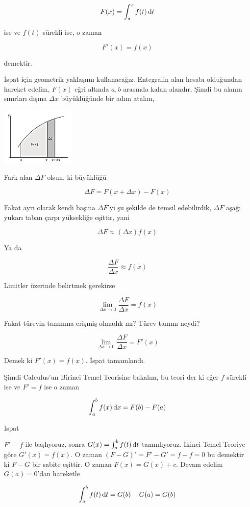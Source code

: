 \documentclass[12pt,fleqn]{article}\usepackage{../../common}
\begin{document}
$$
F(x) = \int _{a}^{x} f(t)\,\mathrm{d} t 
$$

ise ve $f(t)$ sürekli ise, o zaman

$$
F'(x) = f(x)
$$

demektir.

İspat için geometrik yaklaşımı kullanacağız. Entegralin alan hesabı olduğundan
hareket edelim, $F(x)$ eğri altında $a,b$ arasında kalan alandır. Şimdi bu
alanın sınırları dışına $\Delta x$ büyüklüğünde bir adım atalım, 

\includegraphics[width=10em]{ode_mattuck_65_diffint1_05.jpg}

Fark alan $\Delta F$ olsun, ki büyüklüğü

$$
\Delta F = F(x + \Delta x) - F(x)
$$

Fakat ayrı olarak kendi başına $\Delta F$'yi şu şekilde de temsil edebilirdik,
$\Delta F$ aşağı yukarı taban çarpı yüksekliğe eşittir, yani

$$
\Delta F \approx (\Delta x) f(x)
$$

Ya da

$$
\frac{\Delta F}{\Delta x} \approx f(x)
$$

Limitler üzerinde belirtmek gerekirse

$$
\lim_{\Delta x \to 0} \frac{\Delta F}{\Delta x} = f(x)
$$

Fakat türevin tanımına erişmiş olmadık mı? Türev tanımı neydi?

$$
\lim_{\Delta x \to 0} \frac{\Delta F}{\Delta x} = F'(x)
$$

Demek ki $F'(x) = f(x)$. İspat tamamlandı.

Şimdi Calculus'un Birinci Temel Teorisine bakalım, bu teori der ki eğer $f$
sürekli ise ve $F' = f$ ise o zaman 

$$
\int_{a}^{b} f(x) \,\mathrm{d} x = F(b) - F(a)
$$

Ispat

$F' = f$ ile başlıyoruz, sonra $G(x) = \int _{a}^{b} f(t) \,\mathrm{d} t$ tanımlıyoruz.
İkinci Temel Teoriye göre $G'(x) = f(x)$. O zaman $(F-G)' = F'-G'=f-f=0$ bu
demektir ki $F-G$ bir sabite eşittir. O zaman $F(x) = G(x) + c$. Devam edelim
$G(a) = 0$'dan hareketle

$$
\int _{a}^{b} f(t) \,\mathrm{d} t = G(b) - G(a) = G(b) 
$$
\end{document}
